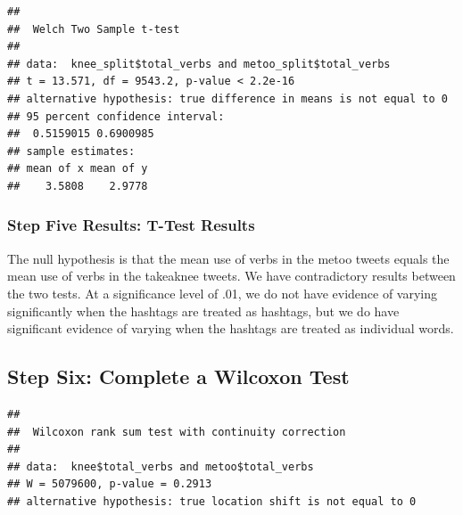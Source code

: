 \documentclass[]{article}
\newenvironment{Shaded}{\begin{snugshade}}{\end{snugshade}}
\newcommand{\KeywordTok}[1]{\textcolor[rgb]{0.13,0.29,0.53}{\textbf{#1}}}
\newcommand{\DataTypeTok}[1]{\textcolor[rgb]{0.13,0.29,0.53}{#1}}
\newcommand{\StringTok}[1]{\textcolor[rgb]{0.31,0.60,0.02}{#1}}
\newcommand{\CommentTok}[1]{\textcolor[rgb]{0.56,0.35,0.01}{\textit{#1}}}
\newcommand{\OperatorTok}[1]{\textcolor[rgb]{0.81,0.36,0.00}{\textbf{#1}}}
\newcommand{\NormalTok}[1]{#1}
\begin{document}
\begin{Shaded}
\end{Shaded}

\begin{verbatim}
## 
##  Welch Two Sample t-test
## 
## data:  knee_split$total_verbs and metoo_split$total_verbs
## t = 13.571, df = 9543.2, p-value < 2.2e-16
## alternative hypothesis: true difference in means is not equal to 0
## 95 percent confidence interval:
##  0.5159015 0.6900985
## sample estimates:
## mean of x mean of y 
##    3.5808    2.9778
\end{verbatim}

\subsubsection{Step Five Results: T-Test
Results}\label{step-five-results-t-test-results}

The null hypothesis is that the mean use of verbs in the metoo tweets
equals the mean use of verbs in the takeaknee tweets. We have
contradictory results between the two tests. At a significance level of
.01, we do not have evidence of varying significantly when the hashtags
are treated as hashtags, but we do have significant evidence of varying
when the hashtags are treated as individual words.

\subsection{Step Six: Complete a Wilcoxon
Test}\label{step-six-complete-a-wilcoxon-test}

\begin{Shaded}
\end{Shaded}

\begin{verbatim}
## 
##  Wilcoxon rank sum test with continuity correction
## 
## data:  knee$total_verbs and metoo$total_verbs
## W = 5079600, p-value = 0.2913
## alternative hypothesis: true location shift is not equal to 0
\end{verbatim}
\end{document}
